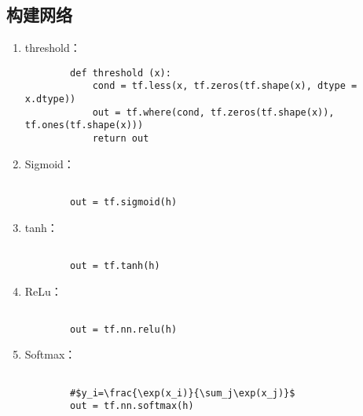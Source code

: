 \documentclass[UTF8]{article}%
\begin{document}
	\subsection{构建网络}
		\begin{enumerate}
		\item threshold：
		\begin{verbatim}
		def threshold (x):
			cond = tf.less(x, tf.zeros(tf.shape(x), dtype = x.dtype))
			out = tf.where(cond, tf.zeros(tf.shape(x)), tf.ones(tf.shape(x)))
			return out		
		\end{verbatim}
		\item Sigmoid：
		\begin{verbatim}
		
		out = tf.sigmoid(h)	
		\end{verbatim}
	
		\item tanh：
		\begin{verbatim}
		
		out = tf.tanh(h)	
		\end{verbatim}

		\item ReLu：
		\begin{verbatim}
		
		out = tf.nn.relu(h)	
		\end{verbatim}
		
		\item Softmax：
		\begin{verbatim}
		
		#$y_i=\frac{\exp(x_i)}{\sum_j\exp(x_j)}$
		out = tf.nn.softmax(h)	
		\end{verbatim}
		\end{enumerate}
\end{document}
